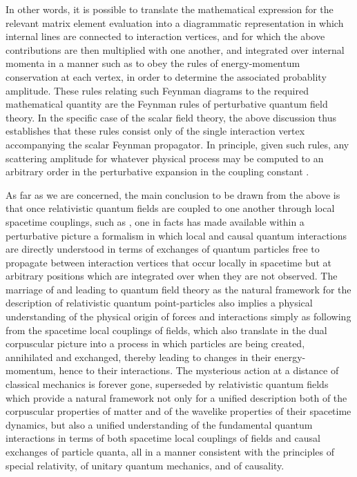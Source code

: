 \documentclass[a4paper,11pt]{article}
\begin{document}
In other words, it is possible to translate the mathematical expression for 
the relevant matrix element evaluation into a diagrammatic representation
in which internal lines are connected to interaction vertices, and for which
the above contributions are then multiplied with one another, and integrated
over internal momenta in a manner such as to obey the rules of energy-momentum
conservation at each vertex, in order to determine the associated probablity
amplitude. These rules relating such Feynman diagrams to the required
ma\-the\-ma\-ti\-cal quantity are the Feynman rules of perturbative quantum 
field theory. In the specific case of the \coordHE{} scalar field theory,
the above discussion thus establishes that these rules consist only of
the single interaction vertex accompanying the scalar Feynman
propagator. In principle, given such rules, any scattering amplitude for
whatever physical process may be computed to an arbitrary order in the
perturbative expansion in the coupling constant \myHighlight{$\lambda$}\coordHE{}.

\vspace{5pt}

As far as we are concerned, the main conclusion to be drawn from the above
is that once relativistic quantum fields are coupled to one another
through local spacetime couplings, such as 
\coordHE{}, one in facts has made available
within a perturbative picture a formalism in which local and causal quantum 
interactions are directly understood in terms of exchanges of quantum 
particles free to propagate between interaction vertices that occur
locally in spacetime but at arbitrary positions which are integrated over
when they are not observed. The marriage of \myHighlight{$\hbar$}\coordHE{} and \coordHE{} leading
to quantum field theory as the natural framework for the description
of relativistic quantum point-particles also implies a physical understanding
of the physical origin of forces and interactions simply as following
from the spacetime local couplings of fields, which also translate in
the dual corpuscular picture into a process in which particles are being 
created, annihilated and exchanged, thereby lea\-ding to 
changes in their energy-momentum, hence to their interactions.
The mysterious action at a distance of classical mechanics is forever gone,
superseded by relativistic quantum fields which provide a natural framework
not only for a unified description both of the corpuscular properties of matter
and of the wavelike properties of their spacetime dynamics, but also a
unified understanding of the fundamental quantum interactions in terms of
both spacetime local couplings of fields and causal exchanges of particle 
quanta, all in a manner consistent with the principles of special relativity,
of unitary quantum mechanics, and of causality.
\end{document}
